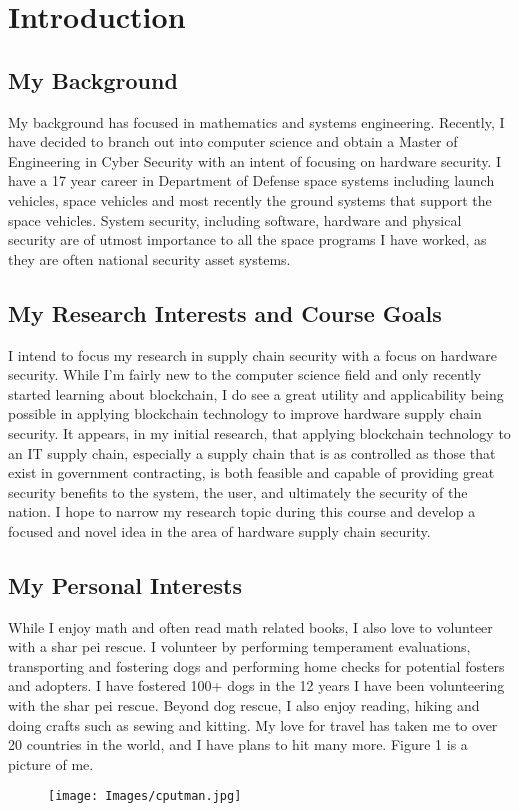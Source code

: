 \section{Introduction}
 \subsection{My Background}
My background has focused in mathematics and systems engineering.  Recently, I have decided to branch out into computer science and obtain a Master of Engineering in Cyber Security with an intent of focusing on hardware security.  I have a 17 year career in Department of Defense space systems including launch vehicles, space vehicles and most recently the ground systems that support the space vehicles.  System security, including software, hardware and physical security are of utmost importance to all the space programs I have worked, as they are often national security asset systems.
\subsection{My Research Interests and Course Goals}
I intend to focus my research in supply chain security with a focus on hardware security. While I'm fairly new to the computer science field and only recently started learning about blockchain, I do see a great utility and applicability being possible in applying blockchain technology to improve hardware supply chain security.  It appears, in my initial research, that applying blockchain technology to an IT supply chain, especially a supply chain that is as controlled as those that exist in government contracting, is both feasible and capable of providing great security benefits to the system, the user, and ultimately the security of the nation. I hope to narrow my research topic during this course and develop a focused and novel idea in the area of hardware supply chain security.
\subsection{My Personal Interests}
While I enjoy math and often read math related books, I also love to volunteer with a shar pei rescue.  I volunteer by performing temperament evaluations, transporting and fostering dogs and  performing home checks for potential fosters and adopters.  I have fostered 100+ dogs in the 12 years I have been volunteering with the shar pei rescue.  Beyond dog rescue, I also enjoy reading, hiking and doing crafts such as sewing and kitting. My love for travel has taken me to over 20 countries in the world, and I have plans to hit many more.  Figure 1 is a picture of me.
\begin{figure}[H]
\centering
\texttt{[image: Images/cputman.jpg]}
\end{figure}

